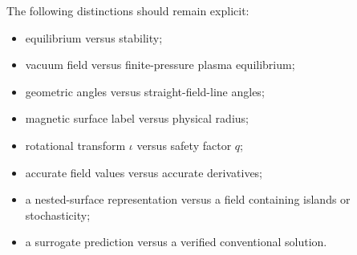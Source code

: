The following distinctions should remain explicit:
\begin{itemize}[leftmargin=1.6em]
\item equilibrium versus stability;
\item vacuum field versus finite-pressure plasma equilibrium;
\item geometric angles versus straight-field-line angles;
\item magnetic surface label versus physical radius;
\item rotational transform $\iota$ versus safety factor $q$;
\item accurate field values versus accurate derivatives;
\item a nested-surface representation versus a field containing islands or stochasticity;
\item a surrogate prediction versus a verified conventional solution.
\end{itemize}

